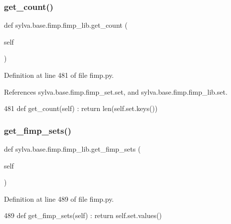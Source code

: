 \subsubsection{\texorpdfstring{get\+\_\+count()}{get\_count()}}
{\footnotesize\ttfamily def sylva.\+base.\+fimp.\+fimp\+\_\+lib.\+get\+\_\+count (\begin{DoxyParamCaption}\item[{}]{self }\end{DoxyParamCaption})}



Definition at line 481 of file fimp.\+py.



References sylva.\+base.\+fimp.\+fimp\+\_\+set.\+set, and sylva.\+base.\+fimp.\+fimp\+\_\+lib.\+set.


\begin{DoxyCode}
481     \textcolor{keyword}{def }get\_count(self) : \textcolor{keywordflow}{return} len(self.set.keys())
\end{DoxyCode}
\mbox{\label{classsylva_1_1base_1_1fimp_1_1fimp__lib_a168e878dc3af6a9b8ffcfa9a57e8253e}} 
\subsubsection{\texorpdfstring{get\+\_\+fimp\+\_\+sets()}{get\_fimp\_sets()}}
{\footnotesize\ttfamily def sylva.\+base.\+fimp.\+fimp\+\_\+lib.\+get\+\_\+fimp\+\_\+sets (\begin{DoxyParamCaption}\item[{}]{self }\end{DoxyParamCaption})}



Definition at line 489 of file fimp.\+py.


\begin{DoxyCode}
489     \textcolor{keyword}{def }get\_fimp\_sets(self) : \textcolor{keywordflow}{return} self.set.values()
\end{DoxyCode}
\mbox{\label{classsylva_1_1base_1_1fimp_1_1fimp__lib_af417cfbd4d5b072db4e355f09d8505f8}} 
